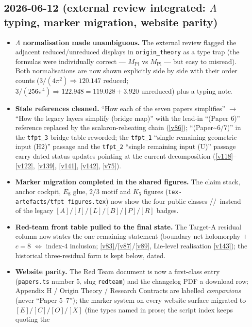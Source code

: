 \subsection*{2026-06-12 (external review integrated: $\Lambda$ typing, marker migration, website parity)}
\begin{itemize}
\item \textbf{$\Lambda$ normalisation made unambiguous.} The external review flagged the
  adjacent reduced/unreduced displays in \texttt{origin\_theory} as a type trap (the
  formulas were individually correct --- $\bar M_{\mathrm{Pl}}$ vs $M_{\mathrm{Pl}}$ ---
  but easy to misread). Both normalisations are now shown explicitly side by side with
  their order counts ($3/(4\pi^2)\Rightarrow120.147$ reduced;
  $3/(256\pi^4)\Rightarrow122.948=119.028+3.920$ unreduced) plus a typing note.
\item \textbf{Stale references cleaned.} ``How each of the seven papers simplifies''
  $\to$ ``How the legacy layers simplify (bridge map)'' with the lead-in ``(Paper 6)''
  reference replaced by the scalaron-reheating chain (\vref{v86});
  ``(Paper\textasciitilde6/7)'' in the \texttt{tfpt\_3} bridge table reworded; the
  \texttt{tfpt\_1} ``single remaining geometric input (H2)'' passage and the
  \texttt{tfpt\_2} ``single remaining input (U)'' passage carry dated status updates
  pointing at the current decomposition (\vref{v118}--\vref{v122}, \vref{v139},
  \vref{v141}, \vref{v142}, \vref{v75}).
\item \textbf{Marker migration completed in the shared figures.} The claim stack,
  anchor cockpit, $E_8$ glue, $2/3$ motif and $K_5$ figures
  (\texttt{tex-artefacts/tfpt\_figures.tex}) now show the four public classes
  \mE/\mC/\mO\ instead of the legacy $[A]/[I]/[L]/[B]/[P]/[R]$ badges.
\item \textbf{Red-team front table pulled to the final state.} The Target-A residual
  column now states the one remaining statement (boundary-net holomorphy $+$ $c{=}8$
  $\Leftrightarrow$ index-$4$ inclusion; \vref{v83}/\vref{v87}/\vref{v89}, Lie-level
  realisation \vref{v143}); the historical three-residual form is kept below, dated.
\item \textbf{Website parity.} The Red Team document is now a first-class entry
  (\texttt{papers.ts} number 5, slug \texttt{redteam}) and the changelog PDF a download
  row; Appendix H / Origin Theory / Research Contracts are labelled \emph{companions}
  (never ``Paper 5--7''); the marker system on every website surface migrated to
  $[E]/[C]/[O]/[X]$ (fine types named in prose; the script index keeps quoting the

\end{itemize}
